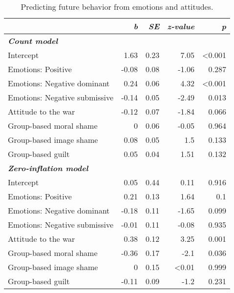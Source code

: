 \documentclass[
]{article}
\begin{document}
\begin{table}[H]

\caption{\label{tab:TableS4}Predicting future behavior from emotions and attitudes.}
\centering
\fontsize{8}{10}\selectfont
\begin{tabular}[t]{lrrrr}
\toprule
\em{ } & \em{b} & \em{SE} & \em{z-value} & \em{p}\\
\midrule
\em{\textbf{Count model}} & \em{\textbf{}} & \em{\textbf{}} & \em{\textbf{}} & \em{\textbf{}}\\
\midrule
Intercept & 1.63 & 0.23 & 7.05 & <0.001\\
Emotions: Positive & -0.08 & 0.08 & -1.06 & 0.287\\
Emotions: Negative dominant & 0.24 & 0.06 & 4.32 & <0.001\\
Emotions: Negative submissive & -0.14 & 0.05 & -2.49 & 0.013\\
\addlinespace
Attitude to the war & -0.12 & 0.07 & -1.84 & 0.066\\
Group-based moral shame & 0 & 0.06 & -0.05 & 0.964\\
Group-based image shame & 0.08 & 0.05 & 1.5 & 0.133\\
Group-based guilt & 0.05 & 0.04 & 1.51 & 0.132\\
\midrule
\em{\textbf{Zero-inflation model}} & \em{\textbf{}} & \em{\textbf{}} & \em{\textbf{}} & \em{\textbf{}}\\
\midrule
\addlinespace
Intercept & 0.05 & 0.44 & 0.11 & 0.916\\
Emotions: Positive & 0.21 & 0.13 & 1.64 & 0.1\\
Emotions: Negative dominant & -0.18 & 0.11 & -1.65 & 0.099\\
Emotions: Negative submissive & -0.01 & 0.11 & -0.08 & 0.935\\
Attitude to the war & 0.38 & 0.12 & 3.25 & 0.001\\
\addlinespace
Group-based moral shame & -0.36 & 0.17 & -2.1 & 0.036\\
Group-based image shame & 0 & 0.15 & <0.01 & 0.999\\
Group-based guilt & -0.11 & 0.09 & -1.2 & 0.231\\
\bottomrule
\end{tabular}
\end{table}
\end{document}
